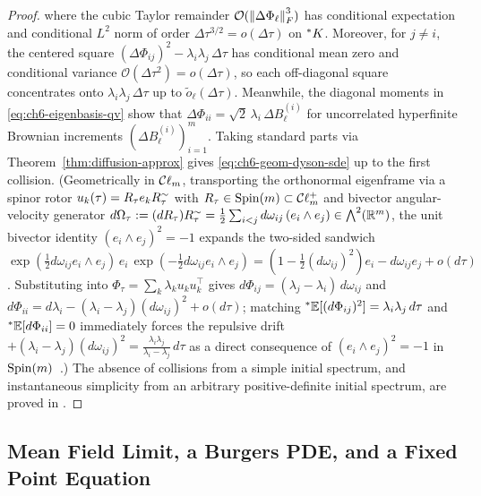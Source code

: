 \begin{proof}
where the cubic Taylor remainder $\mathcal{O}(\left\lVert \Delta\Phi_\ell \right\rVert_F^3)$ has conditional expectation and conditional $L^2$ norm of order $\Delta\tau^{3/2} = o(\Delta\tau)$ on ${}^*K$. Moreover, for $j \neq i$, the centered square $(\Delta\Phi_{ij})^2 - \lambda_i \lambda_j\,\Delta\tau$ has conditional mean zero and conditional variance $\mathcal{O}(\Delta\tau^2) = o(\Delta\tau)$, so each off-diagonal square concentrates onto $\lambda_i \lambda_j\,\Delta\tau$ up to $\tilde{o}_\ell(\Delta\tau)$. Meanwhile, the diagonal moments in \eqref{eq:ch6-eigenbasis-qv} show that $\Delta\Phi_{ii} = \sqrt{2}\,\lambda_i\,\Delta B_\ell^{(i)}$ for uncorrelated hyperfinite Brownian increments $(\Delta B_\ell^{(i)})_{i=1}^m$. Taking standard parts via Theorem~\ref{thm:diffusion-approx} gives \eqref{eq:ch6-geom-dyson-sde} up to the first collision. (Geometrically in $\mathcal{C}\ell_m$, transporting the orthonormal eigenframe via a spinor rotor $u_k(\tau) = R_\tau e_k R_\tau^{\sim}$ with $R_\tau \in \operatorname{Spin}(m) \subset \mathcal{C}\ell_m^+$ and bivector angular-velocity generator $d\Omega_\tau := (dR_\tau)R_\tau^{\sim} = \frac{1}{2}\sum_{i < j} d\omega_{ij}\,(e_i \wedge e_j) \in \bigwedge^2(\mathbb{R}^m)$, the unit bivector identity $(e_i \wedge e_j)^2 = -1$ expands the two-sided sandwich $\exp(\frac{1}{2}d\omega_{ij} e_i\wedge e_j)\,e_i\,\exp(-\frac{1}{2}d\omega_{ij} e_i\wedge e_j) = (1 - \frac{1}{2}(d\omega_{ij})^2)e_i - d\omega_{ij} e_j + o(d\tau)$. Substituting into $\Phi_\tau = \sum_k \lambda_k u_k u_k^\top$ gives $d\Phi_{ij} = (\lambda_j - \lambda_i)\,d\omega_{ij}$ and $d\Phi_{ii} = d\lambda_i - (\lambda_i - \lambda_j)(d\omega_{ij})^2 + o(d\tau)$; matching ${}^*\mathbb{E}[(d\Phi_{ij})^2] = \lambda_i\lambda_j\,d\tau$ and ${}^*\mathbb{E}[d\Phi_{ii}] = 0$ immediately forces the repulsive drift $+(\lambda_i - \lambda_j)(d\omega_{ij})^2 = \frac{\lambda_i\lambda_j}{\lambda_i - \lambda_j}\,d\tau$ as a direct consequence of $(e_i \wedge e_j)^2 = -1$ in $\operatorname{Spin}(m)$~\cite{hestenes1984clifford,doran2003geometric}.) The absence of collisions from a simple initial spectrum, and instantaneous simplicity from an arbitrary positive-definite initial spectrum, are proved in \cite[Theorem 1.1 and Appendix B]{li2026geometric}.
\end{proof}

\subsection{Mean Field Limit, a Burgers PDE, and a Fixed Point Equation}
\label{subsec:burgers-pde}

